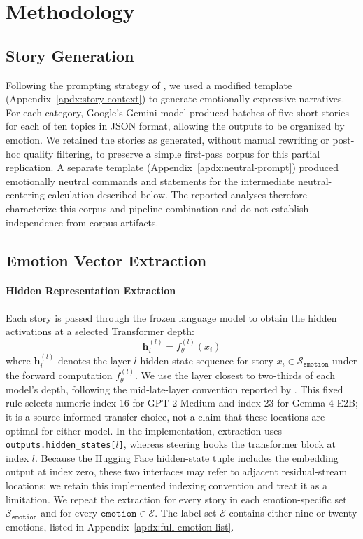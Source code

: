 \section{Methodology}
\label{sec:methodology}

\subsection{Story Generation}

Following the prompting strategy of \cite{sofroniew_emotion_2026}, we used a modified template
(Appendix~\ref{apdx:story-context}) to generate emotionally expressive narratives. For each category, Google's Gemini model
produced batches of five short stories for each of ten topics in JSON format, allowing the outputs to be organized by emotion.
We retained the stories as generated, without manual rewriting or post-hoc quality filtering, to preserve a simple first-pass
corpus for this partial replication. A separate template (Appendix~\ref{apdx:neutral-prompt}) produced emotionally neutral
commands and statements for the intermediate neutral-centering calculation described below. The reported analyses therefore
characterize this corpus-and-pipeline combination and do not establish independence from corpus artifacts.

\subsection{Emotion Vector Extraction}

\paragraph{Hidden Representation Extraction} Each story is passed through the frozen language model to obtain the hidden
activations at a selected Transformer depth:
\begin{equation}
    \mathbf{h}_i^{(l)} = f_\theta^{(l)}(x_i)
    \label{eqtn:hidden-representation}
\end{equation}
where $\mathbf{h}_i^{(l)}$ denotes the layer-$l$ hidden-state sequence for story $x_i\in\mathcal{S}_\mathtt{emotion}$ under
the forward computation $f_\theta^{(l)}$. We use the layer closest to two-thirds of each model's depth, following the mid-late-layer convention reported 
by \cite{sofroniew_emotion_2026}. This fixed rule selects numeric index 16 for GPT-2 Medium and index 23 for Gemma 4 E2B; it is a source-informed 
transfer choice, not a claim that these locations are optimal for either model. In the implementation, extraction uses \texttt{outputs.hidden\_states[$l$]}, 
whereas steering hooks the transformer block at index $l$. Because the Hugging Face hidden-state tuple includes the embedding output at index zero, 
these two interfaces may refer to adjacent residual-stream locations; we retain this implemented indexing convention and treat it as a limitation.
We repeat the extraction for every story in each emotion-specific set $\mathcal{S}_\mathtt{emotion}$ and for every
$\mathtt{emotion}\in\mathcal{E}$. The label set $\mathcal{E}$ contains either nine or twenty emotions, listed in
Appendix~\ref{apdx:full-emotion-list}.

